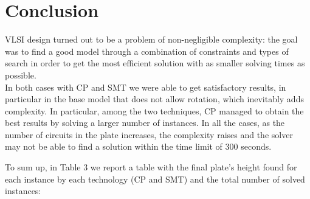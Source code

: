 \section{Conclusion}

VLSI design turned out to be a problem of non-negligible complexity: the goal was to find a good model through a combination of constraints and types of search in order to get the most efficient solution with as smaller solving times as possible. \\
In both cases with CP and SMT we were able to get satisfactory results, in particular in the base model that does not allow rotation, which inevitably adds complexity. In particular, among the two techniques, CP managed to obtain the best results by solving a larger number of instances. In all the cases, as the number of circuits in the plate increases, the complexity raises and the solver may not be able to find a solution within the time limit of 300 seconds.

To sum up, in Table 3 we report a table with the final plate's height found for each instance by each technology (CP and SMT) and the total number of solved instances:

